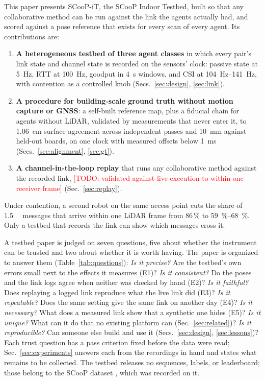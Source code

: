 \documentclass[journal]{IEEEtran}
\newcommand{\todo}[1]{\textcolor{red}{[TODO: #1]}}
\begin{document}
This paper presents SCooP-iT, the SCooP Indoor Testbed, built so that any
collaborative method can be run against the link the agents actually
had, and scored against a pose reference that exists for every scan of
every agent. Its contributions are:
\begin{enumerate}
    \item \textbf{A heterogeneous testbed of three agent classes} in
    which every pair's link state and channel state is recorded on the
    sensors' clock: passive state at \SI{5}{\hertz}, RTT at
    \SI{100}{\hertz}, goodput in \SI{4}{\second} windows, and CSI at
    \SIrange{104}{141}{\hertz}, with contention as a controlled knob
    (Secs.~\ref{sec:design}, \ref{sec:link}).
    \item \textbf{A procedure for building-scale ground truth without
    motion capture or GNSS}: a self-built reference map, plus a fiducial
    chain for agents without LiDAR, validated by measurements that never
    enter it, to \SI{1.06}{\centi\metre} surface agreement across
    independent passes and \SI{10}{\milli\metre} against held-out
    boards, on one clock with measured offsets below
    \SI{1}{\milli\second} (Secs.~\ref{sec:alignment}, \ref{sec:gt}).
    \item \textbf{A channel-in-the-loop replay} that runs any
    collaborative method against the recorded link, \todo{validated
    against live execution to within one receiver frame}
    (Sec.~\ref{sec:replay}).
\end{enumerate}
Under contention, a second robot on the same access point cuts the
share of \SI{1.5}{\mega\byte} messages that arrive within one LiDAR
frame from 86\,\% to \SIrange{59}{68}{\percent}. Only a testbed that
records the link can show which messages cross it.

A testbed paper is judged on seven questions, five about whether the
instrument can be trusted and two about whether it is worth having.
The paper is organized to answer them (Table~\ref{tab:questions}):
\emph{Is it precise?} Are the testbed's own errors small next to the
effects it measures (E1)? \emph{Is it consistent?} Do the poses and
the link logs agree when neither was checked by hand (E2)? \emph{Is
it faithful?} Does replaying a logged link reproduce what the live
link did (E3)? \emph{Is it repeatable?} Does the same setting give
the same link on another day (E4)? \emph{Is it necessary?} What does
a measured link show that a synthetic one hides (E5)? \emph{Is it
unique?} What can it do that no existing platform can
(Sec.~\ref{sec:related})? \emph{Is it reproducible?} Can someone
else build and use it (Secs.~\ref{sec:design}, \ref{sec:lessons})?
Each trust question has a pass criterion fixed before the data were
read; Sec.~\ref{sec:experiments} answers each from the recordings in
hand and states what remains to be collected. The testbed releases no
sequences, labels, or leaderboard; those belong to the SCooP dataset
\cite{scoop_dataset}, which was recorded on it.
\end{document}
